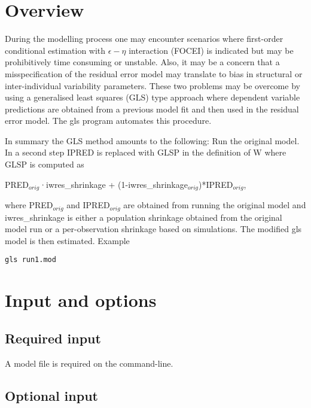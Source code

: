 



\maketitle


\section{Overview}
During the modelling process one may encounter scenarios where first-order conditional estimation with $\epsilon - \eta$ interaction (FOCEI) is indicated but may be prohibitively time consuming or unstable. Also, it may be a concern that a misspecification of the residual error model may translate to bias in structural or inter-individual variability parameters. These two problems may be overcome by using a generalised least squares (GLS) type approach where dependent variable predictions are obtained from a previous model fit and then used in the residual error model. The gls program automates this procedure.

In summary the GLS method amounts to the following: Run the original model. In a second step IPRED is replaced with GLSP in the definition of W where GLSP is computed as 

PRED$_{orig}$·iwres\_shrinkage + (1-iwres\_shrinkage$_{orig}$)*IPRED$_{orig}$, 

where  PRED$_{orig}$ and IPRED$_{orig}$ are obtained from running the original model and iwres\_shrinkage is either a population shrinkage obtained from the original model run or a per-observation shrinkage based on simulations. The modified gls model is then estimated.
Example
\begin{verbatim}
gls run1.mod
\end{verbatim}

\section{Input and options}

\subsection{Required input}
A model file is required on the command-line.


\subsection{Optional input}

